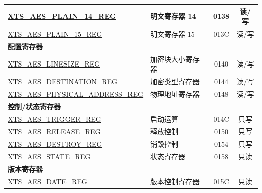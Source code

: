 \begin{longtable}{ | p{6.0cm} | p{6.6cm} | c | c| }
\hyperref[regdesc:XTSAESPLAINNREG]{XTS\_AES\_PLAIN\_14\_REG}  & 明文寄存器 14   & \hexprefix{}0138 & 读/写 \\\hline
\hyperref[regdesc:XTSAESPLAINNREG]{XTS\_AES\_PLAIN\_15\_REG}  & 明文寄存器 15   & \hexprefix{}013C & 读/写 \\\hline
\multicolumn{4}{|l|}{\textbf{配置寄存器}} \\ \hline
\hyperref[regdesc:XTSAESLINESIZEREG]       {XTS\_AES\_LINESIZE\_REG         }   & 加密块大小寄存器    & \hexprefix{}0140 & 读/写 \\\hline
\hyperref[regdesc:XTSAESDESTINATIONREG]    {XTS\_AES\_DESTINATION\_REG      }   & 加密类型寄存器      & \hexprefix{}0144 & 读/写 \\\hline
\hyperref[regdesc:XTSAESPHYSICALADDRESSREG]{XTS\_AES\_PHYSICAL\_ADDRESS\_REG}   & 物理地址寄存器  & \hexprefix{}0148 & 读/写 \\\hline
\multicolumn{4}{|l|}{\textbf{控制/状态寄存器}} \\ \hline
\hyperref[regdesc:XTSAESTRIGGERREG]        {XTS\_AES\_TRIGGER\_REG          }   & 启动运算        & \hexprefix{}014C & 只写   \\\hline
\hyperref[regdesc:XTSAESRELEASEREG]        {XTS\_AES\_RELEASE\_REG          }   & 释放控制        & \hexprefix{}0150 & 只写   \\\hline
\hyperref[regdesc:XTSAESDESTROYREG]        {XTS\_AES\_DESTROY\_REG          }   & 销毁控制        & \hexprefix{}0154 & 只写   \\\hline
\hyperref[regdesc:XTSAESSTATEREG]          {XTS\_AES\_STATE\_REG            }   & 状态寄存器      & \hexprefix{}0158 & 只读   \\\hline
\multicolumn{4}{|l|}{\textbf{版本寄存器}} \\ \hline
\hyperref[regdesc:XTSAESDATEREG]           {XTS\_AES\_DATE\_REG             }   & 版本控制寄存器      & \hexprefix{}015C & 只读 \\\hline

\end{longtable}
%